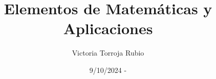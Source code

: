 \documentclass{report}
\begin{document}
\title{Elementos de Matemáticas y Aplicaciones}
\author{Victoria Torroja Rubio}
\date{9/10/2024 -}

\maketitle

\tableofcontents

\pagebreak





\end{document}

